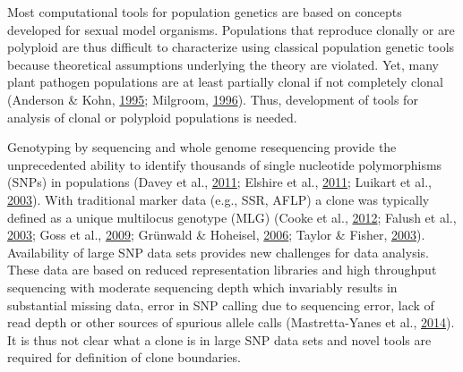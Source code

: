 \documentclass[double,11pt]{beavtex}
\begin{document}
  Most computational tools for population genetics are based on concepts
  developed for sexual model organisms. Populations that reproduce
  clonally or are polyploid are thus difficult to characterize using
  classical population genetic tools because theoretical assumptions
  underlying the theory are violated. Yet, many plant pathogen populations
  are at least partially clonal if not completely clonal (Anderson \&
  Kohn, \protect\hyperlink{ref-anderson1995clonality}{1995}; Milgroom,
  \protect\hyperlink{ref-milgroom1996recombination}{1996}). Thus,
  development of tools for analysis of clonal or polyploid populations is
  needed.
  
  Genotyping by sequencing and whole genome resequencing provide the
  unprecedented ability to identify thousands of single nucleotide
  polymorphisms (SNPs) in populations (Davey et al.,
  \protect\hyperlink{ref-davey2011genome}{2011}; Elshire et al.,
  \protect\hyperlink{ref-elshire2011robust}{2011}; Luikart et al.,
  \protect\hyperlink{ref-luikart2003power}{2003}). With traditional marker
  data (e.g., SSR, AFLP) a clone was typically defined as a unique
  multilocus genotype (MLG) (Cooke et al.,
  \protect\hyperlink{ref-cooke2012genome}{2012}; Falush et al.,
  \protect\hyperlink{ref-Falush01082003}{2003}; Goss et al.,
  \protect\hyperlink{ref-goss2009population}{2009}; Grünwald \& Hoheisel,
  \protect\hyperlink{ref-grunwald2006hierarchical}{2006}; Taylor \&
  Fisher, \protect\hyperlink{ref-taylor2003fungal}{2003}). Availability of
  large SNP data sets provides new challenges for data analysis. These
  data are based on reduced representation libraries and high throughput
  sequencing with moderate sequencing depth which invariably results in
  substantial missing data, error in SNP calling due to sequencing error,
  lack of read depth or other sources of spurious allele calls
  (Mastretta-Yanes et al.,
  \protect\hyperlink{ref-mastretta2015restriction}{2014}). It is thus not
  clear what a clone is in large SNP data sets and novel tools are
  required for definition of clone boundaries.
  
\end{document}
